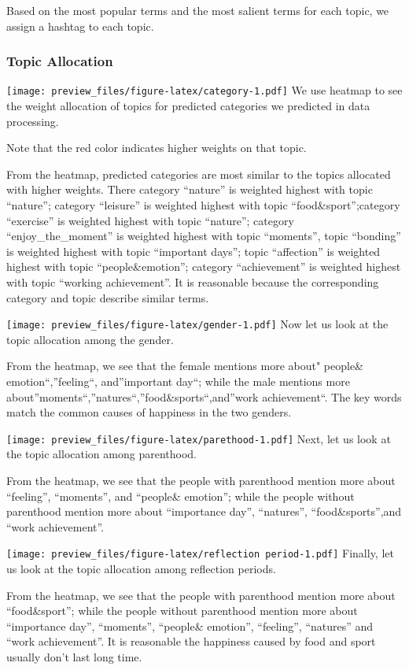 \documentclass[]{article}
\begin{document}
Based on the most popular terms and the most salient terms for each
topic, we assign a hashtag to each topic.

\subsubsection{Topic Allocation}\label{topic-allocation-1}

\texttt{[image: preview\_files/figure-latex/category-1.pdf]} We use
heatmap to see the weight allocation of topics for predicted categories
we predicted in data processing.

Note that the red color indicates higher weights on that topic.

From the heatmap, predicted categories are most similar to the topics
allocated with higher weights. There category ``nature'' is weighted
highest with topic ``nature''; category ``leisure'' is weighted highest
with topic ``food\&sport'';category ``exercise'' is weighted highest
with topic ``nature''; category ``enjoy\_the\_moment'' is weighted
highest with topic ``moments'', topic ``bonding'' is weighted highest
with topic ``important days''; topic ``affection'' is weighted highest
with topic ``people\&emotion''; category ``achievement'' is weighted
highest with topic ``working achievement''. It is reasonable because the
corresponding category and topic describe similar terms.

\texttt{[image: preview\_files/figure-latex/gender-1.pdf]} Now let us
look at the topic allocation among the gender.

From the heatmap, we see that the female mentions more about" people\&
emotion``,''feeling``, and''important day``; while the male mentions
more about''moments``,''natures``,''food\&sports``,and''work
achievement``. The key words match the common causes of happiness in the
two genders.

\texttt{[image: preview\_files/figure-latex/parethood-1.pdf]} Next, let
us look at the topic allocation among parenthood.

From the heatmap, we see that the people with parenthood mention more
about ``feeling'', ``moments'', and ``people\& emotion''; while the
people without parenthood mention more about ``importance day'',
``natures'', ``food\&sports'',and ``work achievement''.

\texttt{[image: preview\_files/figure-latex/reflection period-1.pdf]}
Finally, let us look at the topic allocation among reflection periods.

From the heatmap, we see that the people with parenthood mention more
about ``food\&sport''; while the people without parenthood mention more
about ``importance day'', ``moments'', ``people\& emotion'',
``feeling'', ``natures'' and ``work achievement''. It is reasonable the
happiness caused by food and sport usually don't last long time.
\end{document}
